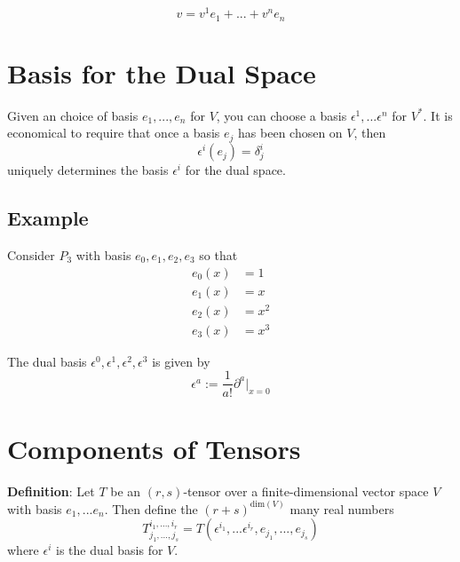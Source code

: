 \documentclass[
  letterpaper,
  DIV=11,
  numbers=noendperiod,
  oneside]{scrreprt}
\begin{document}
\begin{equation}
    v = v^1e_1 + ... + v^n e_n
\end{equation}

\hypertarget{basis-for-the-dual-space}{%
\section{Basis for the Dual Space}\label{basis-for-the-dual-space}}

Given an choice of basis \(e_1, ..., e_n\) for \(V\), you can choose a
basis \(\epsilon^1,...\epsilon^n\) for \(V^*\). It is economical to
require that once a basis \(e_j\) has been chosen on \(V\), then
\begin{equation}
    \epsilon^i(e_j) = \delta_j^i
\end{equation} uniquely determines the basis \(\epsilon^i\) for the dual
space.

\hypertarget{example-5}{%
\subsection{Example}\label{example-5}}

Consider \(P_3\) with basis \(e_0, e_1, e_2, e_3\) so that \begin{align}
    e_0(x) &= 1 \\ 
    e_1(x) &= x \\ 
    e_2(x) &= x^2 \\ 
    e_3(x) &= x^3
\end{align}

The dual basis \(\epsilon^0, \epsilon^1, \epsilon^2, \epsilon^3\) is
given by \begin{equation}
    \epsilon^a := \frac{1}{a!}\partial^a\Big\vert_{x=0}
\end{equation}

\hypertarget{components-of-tensors}{%
\section{Components of Tensors}\label{components-of-tensors}}

\textbf{Definition}: Let \(T\) be an \((r,s)\)-tensor over a
finite-dimensional vector space \(V\) with basis \(e_1,...e_n\). Then
define the \((r+s)^{\text{dim}(V)}\) many real numbers \begin{equation}
    T^{i_1,...,i_r}_{j_1,...,j_s} = T(\epsilon^{i_1},...\epsilon^{i_r},e_{j_1}, ..., e_{j_s})
\end{equation} where \(\epsilon^i\) is the dual basis for \(V\).
\end{document}

